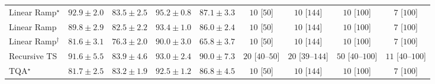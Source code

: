 \begin{tabular}{l|cccc|cccc|}
Linear Ramp$^\star$ & {\cellcolor[HTML]{760C71}} \color[HTML]{F1F1F1} $92.9\pm 2.0$ & {\cellcolor[HTML]{8A54A6}} \color[HTML]{F1F1F1} $83.5\pm 2.5$ & {\cellcolor[HTML]{61065D}} \color[HTML]{F1F1F1} $95.2\pm 0.8$ & {\cellcolor[HTML]{873897}} \color[HTML]{F1F1F1} $87.1\pm 3.3$ & {\cellcolor[HTML]{FFF6F2}} \color[HTML]{000000} $10$ [$50$] & {\cellcolor[HTML]{FFF6F2}} \color[HTML]{000000} $10$ [$144$] & {\cellcolor[HTML]{FFF6F2}} \color[HTML]{000000} $10$ [$100$] & {\cellcolor[HTML]{FFF6F2}} \color[HTML]{000000} $7$ [$100$] \\
Linear Ramp & {\cellcolor[HTML]{832088}} \color[HTML]{F1F1F1} $89.8\pm 2.9$ & {\cellcolor[HTML]{8B5CAA}} \color[HTML]{F1F1F1} $82.5\pm 2.2$ & {\cellcolor[HTML]{710A6D}} \color[HTML]{F1F1F1} $93.4\pm 1.0$ & {\cellcolor[HTML]{88419D}} \color[HTML]{F1F1F1} $86.0\pm 2.4$ & {\cellcolor[HTML]{FFF6F2}} \color[HTML]{000000} $10$ [$50$] & {\cellcolor[HTML]{FFF6F2}} \color[HTML]{000000} $10$ [$144$] & {\cellcolor[HTML]{FFF6F2}} \color[HTML]{000000} $10$ [$100$] & {\cellcolor[HTML]{FFF6F2}} \color[HTML]{000000} $7$ [$100$] \\
Linear Ramp$^\dagger$ & {\cellcolor[HTML]{8B62AD}} \color[HTML]{F1F1F1} $81.6\pm 3.1$ & {\cellcolor[HTML]{8C8BC0}} \color[HTML]{F1F1F1} $76.3\pm 2.0$ & {\cellcolor[HTML]{831F86}} \color[HTML]{F1F1F1} $90.0\pm 3.0$ & {\cellcolor[HTML]{B2CAE1}} \color[HTML]{000000} $65.8\pm 3.7$ & {\cellcolor[HTML]{FFF6F2}} \color[HTML]{000000} $10$ [$50$] & {\cellcolor[HTML]{FFF6F2}} \color[HTML]{000000} $10$ [$144$] & {\cellcolor[HTML]{FFF6F2}} \color[HTML]{000000} $10$ [$100$] & {\cellcolor[HTML]{FFF6F2}} \color[HTML]{000000} $7$ [$100$] \\
Recursive TS & {\cellcolor[HTML]{810F7C}} \color[HTML]{F1F1F1} $91.6\pm 5.5$ & {\cellcolor[HTML]{8A51A5}} \color[HTML]{F1F1F1} $83.9\pm 4.6$ & {\cellcolor[HTML]{740B70}} \color[HTML]{F1F1F1} $93.0\pm 2.4$ & {\cellcolor[HTML]{831F86}} \color[HTML]{F1F1F1} $90.0\pm 7.3$ & {\cellcolor[HTML]{FFF3EF}} \color[HTML]{000000} $20$ [$40$--$50$] & {\cellcolor[HTML]{FFF3EF}} \color[HTML]{000000} $20$ [$39$--$144$] & {\cellcolor[HTML]{FEEBE8}} \color[HTML]{000000} $50$ [$40$--$100$] & {\cellcolor[HTML]{FFF5F1}} \color[HTML]{000000} $11$ [$40$--$100$] \\
TQA$^\star$ & {\cellcolor[HTML]{8B62AD}} \color[HTML]{F1F1F1} $81.7\pm 2.5$ & {\cellcolor[HTML]{8A56A7}} \color[HTML]{F1F1F1} $83.2\pm 1.9$ & {\cellcolor[HTML]{790D75}} \color[HTML]{F1F1F1} $92.5\pm 1.2$ & {\cellcolor[HTML]{873B99}} \color[HTML]{F1F1F1} $86.8\pm 4.5$ & {\cellcolor[HTML]{FFF6F2}} \color[HTML]{000000} $10$ [$50$] & {\cellcolor[HTML]{FFF6F2}} \color[HTML]{000000} $10$ [$144$] & {\cellcolor[HTML]{FFF6F2}} \color[HTML]{000000} $10$ [$100$] & {\cellcolor[HTML]{FFF6F2}} \color[HTML]{000000} $7$ [$100$] \\

\end{tabular}
